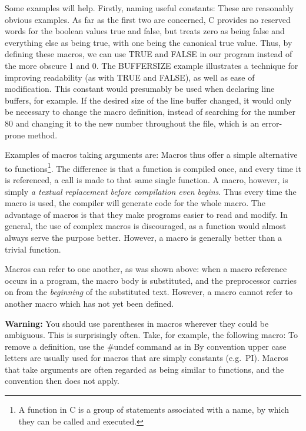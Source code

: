 Some examples will help. Firstly, naming useful constants:
These are  reasonably obvious  examples. As  far as  the  first  two 
are concerned, C provides no reserved words for the boolean values
true and false, but treats  zero as  being false  and everything else
as being true, with one being the canonical true  value. Thus,
by defining  these macros, we can use {\cd TRUE} and  {\cd FALSE} in
our program  instead of  the more  obscure 1  and  0.  The {\cd
BUFFERSIZE} example  illustrates a technique for improving
readability (as with {\cd TRUE} and  {\cd FALSE}), as  well  as ease 
of  modification.  This  constant  would presumably be  used when 
declaring line  buffers, for example. If the desired size of  the
line  buffer changed,  it would  only be  necessary to change the
macro definition,  instead of  searching for  the number 80 and
changing it to the new number throughout the file, which is an
error-prone method.

Examples of macros taking arguments are:
 Macros thus  offer a  simple alternative  to functions\footnote{A
function in C is a group of statements associated with a name, by
which they can be called and executed.}. The difference is that a 
function is  compiled once, and every time it is referenced, a call is
made to  that same  single function.  A macro,  however, is simply
{\em a textual replacement before compilation even  begins\/}. Thus 
every time the macro is used, the compiler will generate code  for
the  whole macro. The advantage of macros is that they  make
programs  easier to  read and  modify. In  general, the use of
complex macros  is discouraged,  as a  function would  almost always
serve the purpose better. However, a macro is generally better than a
trivial function.

Macros can  refer to  one another,  as was  shown  above:  when  a 
macro reference occurs  in a  program,  the  macro  body  is 
substituted,  and  the preprocessor carries on from the
{\em beginning\/} of the substituted text. However, a macro cannot refer to
another macro which has not yet been defined.

{\bf Warning:} You  should use  parentheses in  macros wherever 
they could  be ambiguous. This is surprisingly often. Take, for
example, the following macro:
To remove a definition, use the {\cd \#undef} command as in
     By convention upper case letters are usually used for macros that
are simply constants (e.g.\ PI). Macros that take arguments are often
regarded as being similar to functions, and the convention then does not
apply.


